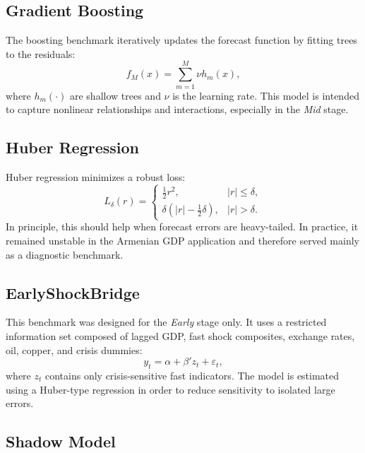 \documentclass[12pt,a4paper]{report}
\begin{document}
\subsection{Gradient Boosting}

The boosting benchmark iteratively updates the forecast function by fitting trees to the residuals:
\begin{equation}
    f_M(x) = \sum_{m=1}^{M} \nu h_m(x),
\end{equation}
where $h_m(\cdot)$ are shallow trees and $\nu$ is the learning rate. This model is intended to capture nonlinear relationships and interactions, especially in the \textit{Mid} stage.

\subsection{Huber Regression}

Huber regression minimizes a robust loss:
\begin{equation}
    L_\delta(r) =
    \begin{cases}
        \frac{1}{2}r^2, & |r| \leq \delta, \\
        \delta \left(|r| - \frac{1}{2}\delta \right), & |r| > \delta.
    \end{cases}
\end{equation}
In principle, this should help when forecast errors are heavy-tailed. In practice, it remained unstable in the Armenian GDP application and therefore served mainly as a diagnostic benchmark.

\subsection{EarlyShockBridge}

This benchmark was designed for the \textit{Early} stage only. It uses a restricted information set composed of lagged GDP, fast shock composites, exchange rates, oil, copper, and crisis dummies:
\begin{equation}
    y_t = \alpha + \beta' z_t + \varepsilon_t,
\end{equation}
where $z_t$ contains only crisis-sensitive fast indicators. The model is estimated using a Huber-type regression in order to reduce sensitivity to isolated large errors.

\subsection{Shadow Model}
\end{document}
